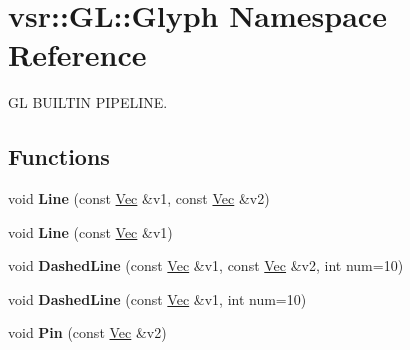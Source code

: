 \hypertarget{namespacevsr_1_1_g_l_1_1_glyph}{\section{vsr\-:\-:G\-L\-:\-:Glyph Namespace Reference}
\label{namespacevsr_1_1_g_l_1_1_glyph}
}


G\-L B\-U\-I\-L\-T\-I\-N P\-I\-P\-E\-L\-I\-N\-E.  


\subsection*{Functions}
\begin{DoxyCompactItemize}
\item 
\hypertarget{namespacevsr_1_1_g_l_1_1_glyph_ac4b2f1c4afe4012a99e95761ac3c7778}{void {\bfseries Line} (const \hyperlink{namespacevsr_a0d061c30ac198a710a1b92dd8b343273}{Vec} \&v1, const \hyperlink{namespacevsr_a0d061c30ac198a710a1b92dd8b343273}{Vec} \&v2)}\label{namespacevsr_1_1_g_l_1_1_glyph_ac4b2f1c4afe4012a99e95761ac3c7778}

\item 
\hypertarget{namespacevsr_1_1_g_l_1_1_glyph_a4038b9dfaf242cc3c477e2713d361e18}{void {\bfseries Line} (const \hyperlink{namespacevsr_a0d061c30ac198a710a1b92dd8b343273}{Vec} \&v1)}\label{namespacevsr_1_1_g_l_1_1_glyph_a4038b9dfaf242cc3c477e2713d361e18}

\item 
\hypertarget{namespacevsr_1_1_g_l_1_1_glyph_a462ec5ed8fa49ea6ae8f2b17c51e0de5}{void {\bfseries Dashed\-Line} (const \hyperlink{namespacevsr_a0d061c30ac198a710a1b92dd8b343273}{Vec} \&v1, const \hyperlink{namespacevsr_a0d061c30ac198a710a1b92dd8b343273}{Vec} \&v2, int num=10)}\label{namespacevsr_1_1_g_l_1_1_glyph_a462ec5ed8fa49ea6ae8f2b17c51e0de5}

\item 
\hypertarget{namespacevsr_1_1_g_l_1_1_glyph_ac61e2ab224eef15b37d2c316dae89258}{void {\bfseries Dashed\-Line} (const \hyperlink{namespacevsr_a0d061c30ac198a710a1b92dd8b343273}{Vec} \&v1, int num=10)}\label{namespacevsr_1_1_g_l_1_1_glyph_ac61e2ab224eef15b37d2c316dae89258}

\item 
\hypertarget{namespacevsr_1_1_g_l_1_1_glyph_abbcbc040b9df71992b8cd31b50f3bd85}{void {\bfseries Pin} (const \hyperlink{namespacevsr_a0d061c30ac198a710a1b92dd8b343273}{Vec} \&v2)}\label{namespacevsr_1_1_g_l_1_1_glyph_abbcbc040b9df71992b8cd31b50f3bd85}


\end{DoxyCompactItemize}
